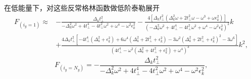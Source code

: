 在低能量下，对这些反常格林函数做低阶泰勒展开
\begin{equation}
\begin{aligned}
F_{(i_y=1)}\approx&-\frac{\Delta_k  t_\perp^2}{-\Delta_k ^2 \omega ^2+4 t_\perp^4-4 t_\perp^2 \omega ^2+\omega ^4-\omega ^2 \epsilon_k ^2}-\frac{4  \left[\Delta_k  t_\perp^2 \left(\Delta_k ^2 \omega +2 t_\perp^2 \omega -\omega ^3+\omega  \epsilon_k ^2\right)\right]}{\left(-\Delta_k ^2 \omega ^2+4 t_\perp^4-4 t_\perp^2 \omega ^2+\omega ^4-\omega ^2 \epsilon_k ^2\right)^2}k\\
&+\frac{4 \Delta_k   t_\perp^2 \left[-4 t_\perp^4 \left(\Delta_k ^2+\epsilon_k ^2\right)+6 \omega ^4 \left(\Delta_k ^2+2 t_\perp^2+\epsilon_k ^2\right)-3 \omega ^2 \left(\Delta_k ^2+2 t_\perp^2+\epsilon_k ^2\right)^2-3 \omega ^6\right]}{\left(4 t_\perp^4-\omega ^2 \left(\Delta_k ^2+4 t_\perp^2+\epsilon_k ^2\right)+\omega ^4\right)^3}k^2,
\end{aligned}
\end{equation}
\begin{equation}
F_{(i_y=N_y)}=-\frac{\Delta_k  t_\perp^2}{-\Delta_k ^2 \omega ^2+4 t_\perp^4-4 t_\perp^2 \omega ^2+\omega ^4-\omega ^2 \epsilon_k ^2},
\end{equation}



